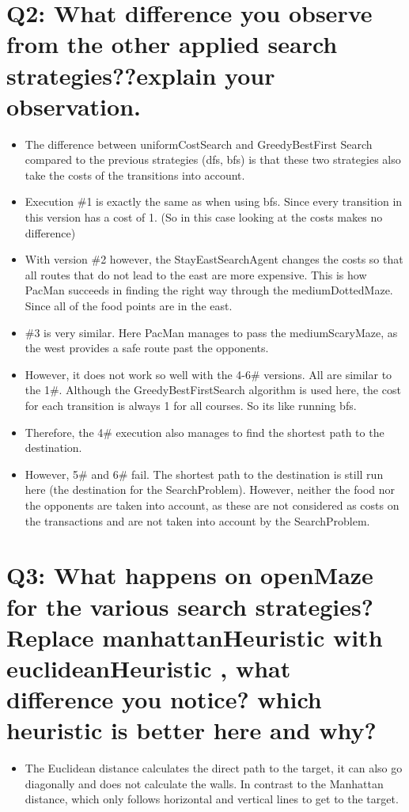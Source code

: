 \section{Q2: What difference you observe from the other applied search strategies??explain your observation.}
\begin{itemize}
    
    \item The difference between uniformCostSearch and GreedyBestFirst Search compared to the previous strategies (dfs, bfs) is that these two strategies also take the costs of the transitions into account.
    \item Execution \#1 is exactly the same as when using bfs. Since every transition in this version has a cost of 1. (So in this case looking at the costs makes no difference)
    \item With version \#2 however, the StayEastSearchAgent changes the costs so that all routes that do not lead to the east are more expensive. This is how PacMan succeeds in finding the right way through the mediumDottedMaze. Since all of the food points are in the east.
    \item \#3 is very similar. Here PacMan manages to pass the mediumScaryMaze, as the west provides a safe route past the opponents.
    \item However, it does not work so well with the 4-6\# versions. All are similar to the 1\#. Although the GreedyBestFirstSearch algorithm is used here, the cost for each transition is always 1 for all courses. So its like running bfs.
    \item Therefore, the 4\# execution also manages to find the shortest path to the destination.
    \item However, 5\# and 6\# fail. The shortest path to the destination is still run here (the destination for the SearchProblem). However, neither the food nor the opponents are taken into account, as these are not considered as costs on the transactions and are not taken into account by the SearchProblem.

\end{itemize}



\section{Q3: What happens on openMaze for the various search strategies? Replace manhattanHeuristic
with euclideanHeuristic , what difference you notice? which heuristic is better here and
why?}
\begin{itemize}
    \item The Euclidean distance calculates the direct path to the target, it can also go diagonally and does not calculate the walls.
    In contrast to the Manhattan distance, which only follows horizontal and vertical lines to get to the target.
\end{itemize}

